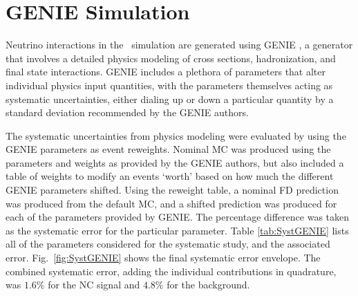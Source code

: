 \section{GENIE Simulation}
\label{sec:SystGENIE}

Neutrino interactions in the \nova~simulation are generated using GENIE \cite{ref:GENIE}, a generator that involves a detailed physics modeling of cross sections, hadronization, and final state interactions. GENIE includes a plethora of parameters that alter individual physics input quantities, with the parameters themselves acting as systematic uncertainties, either dialing up or down a particular quantity by a standard deviation recommended by the GENIE authors.

The systematic uncertainties from physics modeling were evaluated by using the GENIE parameters as event reweights. Nominal MC was produced using the parameters and weights as provided by the GENIE authors, but also included a table of weights to modify an events `worth' based on how much the different GENIE parameters shifted. Using the reweight table, a nominal FD prediction was produced from the default MC, and a shifted prediction was produced for each of the parameters provided by GENIE. The percentage difference was taken as the systematic error for the particular parameter. Table \ref{tab:SystGENIE} lists all of the parameters considered for the systematic study, and the associated error. Fig.~\ref{fig:SystGENIE} shows the final systematic error envelope. The combined systematic error, adding the individual contributions in quadrature, was $1.6\%$ for the NC signal and $4.8\%$ for the background.

